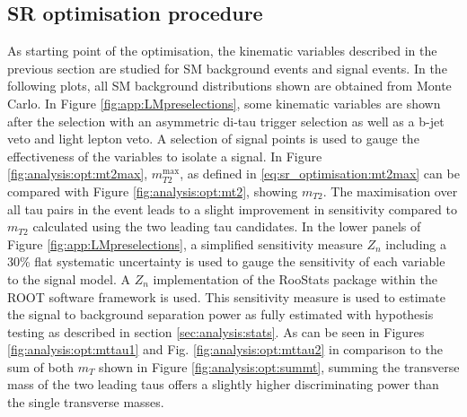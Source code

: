 \subsection{SR optimisation procedure}
As starting point of the optimisation,  the kinematic variables described in the previous section are studied for \ac{SM} background events and signal events. In the following plots, all \ac{SM} background distributions shown are obtained from Monte Carlo.
In Figure \ref{fig:app:LMpreselections}, some kinematic variables are shown after the selection with an asymmetric di-tau trigger selection as well as a b-jet veto and light lepton veto.  %
A selection of signal points is used to gauge the effectiveness of the variables to isolate a signal.
In Figure \ref{fig:analysis:opt:mt2max},  $m_{T2}^\text{max}$,  as defined in \eqref{eq:sr_optimisation:mt2max} can be compared with Figure \ref{fig:analysis:opt:mt2},  showing $m_{T2}$. The maximisation over all tau pairs in the event leads to a slight improvement in sensitivity compared to $m_{T2}$ calculated using the two leading tau candidates.  In the lower panels of Figure \ref{fig:app:LMpreselections},  a simplified sensitivity measure $Z_n$ \cite{zndefinition} including a 30\% flat systematic uncertainty is used to gauge the sensitivity of each variable to the signal model.  A $Z_n$ implementation of the RooStats \cite{RooStats} package within the ROOT \cite{Root} software framework is used.  This sensitivity measure is used to estimate the signal to background separation power as fully estimated with hypothesis testing as described in section \ref{sec:analysis:stats}.
As can be seen in Figures \ref{fig:analysis:opt:mttau1} and Fig.  \ref{fig:analysis:opt:mttau2} in comparison to the sum of both $m_T$ shown in Figure \ref{fig:analysis:opt:summt},  summing the transverse mass of the two leading taus offers a slightly higher discriminating power than the single transverse masses.

